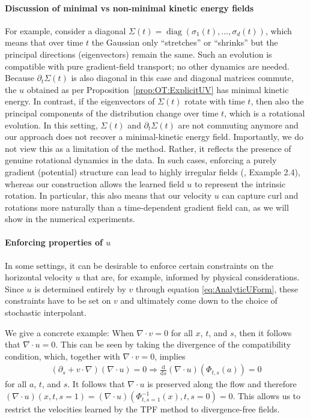 \documentclass{article}
\newcommand{\rd}{\mathrm d}
\theoremstyle{definition}
\theoremstyle{plain}
\theoremstyle{definition}
\theoremstyle{remark}
\begin{document}
\paragraph{Discussion of minimal vs non-minimal kinetic energy fields} For example, consider a diagonal $\Sigma(t) = \operatorname{diag}(\sigma_1(t), \dots, \sigma_d(t))$, which means that over time $t$ the Gaussian only ``stretches'' or ``shrinks'' but the principal directions (eigenvectors) remain the same. Such an evolution is compatible with pure gradient-field transport; no other dynamics are needed. Because $\partial_t\Sigma(t)$ is also diagonal in this case and diagonal matrices commute, the $u$ obtained as per Proposition~\ref{prop:OT:ExplicitUV} has minimal kinetic energy. In contrast, if the eigenvectors of $\Sigma(t)$ rotate with time $t$, then also the principal components of the distribution change over time $t$, which is a rotational evolution. In this setting, $\Sigma(t)$ and $\partial_t \Sigma(t)$ are not commuting anymore and our approach does not recover a minimal-kinetic energy field.
Importantly, we do not view this as a limitation of the method. Rather, it reflects the presence of genuine rotational dynamics in the data. In such cases, enforcing a purely gradient (potential) structure can lead to highly irregular fields (\citet{gigli_second_2011}, Example 2.4), whereas our construction allows the learned field $u$ to represent the intrinsic rotation.
In particular, this also means that our velocity $u$ can capture curl and rotations more naturally than a time-dependent gradient field can, as we will show in the numerical experiments.   

\paragraph{Enforcing properties of $u$} In some settings, it can be desirable to enforce certain constraints on the horizontal velocity $u$ that are, for example, informed by physical considerations. Since $u$ is determined entirely by $v$ through equation \eqref{eq:AnalyticUForm}, these constraints have to be set on $v$ and ultimately come down to the choice of stochastic interpolant.

We give a concrete example: When $\nabla \cdot v = 0$ for all $x$, $t$, and $s$, then it follows that $\nabla \cdot u = 0$. This can be seen by taking the divergence of the compatibility condition, which, together with $\nabla \cdot v = 0$, implies
\begin{align}
    (\partial_s + v \cdot \nabla) (\nabla \cdot u) = 0 \Rightarrow \frac{\rd}{\rd s} (\nabla \cdot u)(\Phi_{t,s}(a)) = 0
\end{align}
for all $a$, $t$, and $s$. It follows that $\nabla \cdot u$ is preserved along the flow and therefore $(\nabla \cdot u)(x,t,s=1) = (\nabla \cdot u)(\Phi_{t,s=1}^{-1}(x),t, s=0) = 0$. This allows us to restrict the velocities learned by the TPF method to divergence-free fields.
\end{document}
